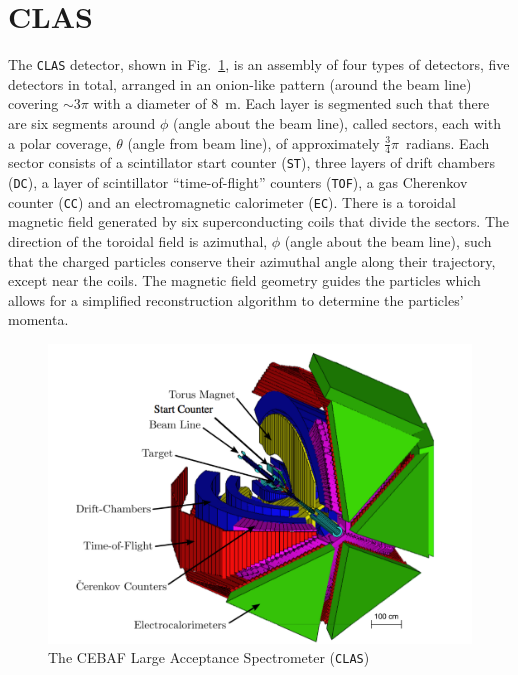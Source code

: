 \documentclass{aip-cp}
\begin{document}
\section{CLAS}
The \textsc{\texttt{CLAS}} detector, shown in Fig.~\ref{fig:clas}, is an assembly of four types of detectors, five detectors in total, arranged in an onion-like pattern (around the beam line) covering $\sim 3\pi$ with a diameter of 8~m. Each layer is segmented such that there are six segments around $\phi$ (angle about the beam line), called sectors, each with a polar coverage, $\theta$ (angle from beam line), of approximately $\frac{3}{4}\pi$~radians. Each sector consists of a scintillator start counter (\textsc{\texttt{ST}}), three layers of drift chambers (\textsc{\texttt{DC}}), a layer of scintillator ``time-of-flight'' counters (\textsc{\texttt{TOF}}), a gas Cherenkov counter (\textsc{\texttt{CC}}) and an electromagnetic calorimeter (\textsc{\texttt{EC}}). There is a toroidal magnetic field generated by six superconducting coils that divide the sectors. The direction of the toroidal field is azimuthal, $\phi$ (angle about the beam line), such that the charged particles conserve their azimuthal angle along their trajectory, except near the coils. The magnetic field geometry guides the particles which allows for a simplified reconstruction algorithm to determine the particles' momenta.
\begin{figure}[h]
	\centerline{\includegraphics[width=175 pt]{figures/clas_schematicIII.pdf}}
	\caption{The CEBAF Large Acceptance Spectrometer (\textsc{\texttt{CLAS}}) }
	\label{fig:clas}
\end{figure}
\end{document}
